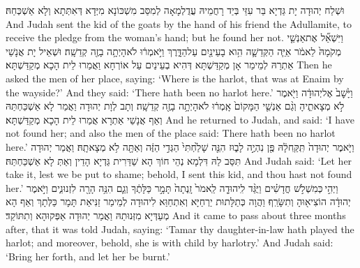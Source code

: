 {וּשְׁלַח יְהוּדָה יָת גַּדְיָא בַּר עִזֵּי בְּיַד רָחֲמֵיהּ עֲדֻלְמָאָה לְמִסַּב מִשְׁכּוֹנָא מִיְּדָא דְּאִתְּתָא וְלָא אַשְׁכְּחַהּ׃}
{And Judah sent the kid of the goats by the hand of his friend the Adullamite, to receive the pledge from the woman’s hand; but he found her not.}{}
{וַיִּשְׁאַ֞ל אֶת\maqqaf אַנְשֵׁ֤י מְקֹמָהּ֙ לֵאמֹ֔ר אַיֵּ֧ה הַקְּדֵשָׁ֛ה הִ֥וא בָעֵינַ֖יִם עַל\maqqaf הַדָּ֑רֶךְ וַיֹּ֣אמְר֔וּ לֹא\maqqaf הָיְתָ֥ה בָזֶ֖ה קְדֵשָֽׁה׃}
{וּשְׁאֵיל יָת אֲנָשֵׁי אַתְרַהּ לְמֵימַר אָן מְקַדַּשְׁתָּא דְּהִיא בְעֵינַיִם עַל אוֹרְחָא וַאֲמַרוּ לֵית הָכָא מְקַדַּשְׁתָּא׃}
{Then he asked the men of her place, saying: ‘Where is the harlot, that was at Enaim by the wayside?’ And they said: ‘There hath been no harlot here.’}{}
{וַיָּ֙שׇׁב֙ אֶל\maqqaf יְהוּדָ֔ה וַיֹּ֖אמֶר לֹ֣א מְצָאתִ֑יהָ וְגַ֨ם אַנְשֵׁ֤י הַמָּקוֹם֙ אָֽמְר֔וּ לֹא\maqqaf הָיְתָ֥ה בָזֶ֖ה קְדֵשָֽׁה׃}
{וְתָב לְוָת יְהוּדָה וַאֲמַר לָא אַשְׁכַּחְתַּהּ וְאַף אֲנָשֵׁי אַתְרָא אֲמַרוּ לֵית הָכָא מְקַדַּשְׁתָּא׃}
{And he returned to Judah, and said: ‘I have not found her; and also the men of the place said: There hath been no harlot here.’}{}
{וַיֹּ֤אמֶר יְהוּדָה֙ תִּֽקַּֽח\maqqaf לָ֔הּ פֶּ֖ן נִהְיֶ֣ה לָב֑וּז הִנֵּ֤ה שָׁלַ֙חְתִּי֙ הַגְּדִ֣י הַזֶּ֔ה וְאַתָּ֖ה לֹ֥א מְצָאתָֽהּ׃}
{וַאֲמַר יְהוּדָה תִּסַּב לַהּ דִּלְמָא נְהֵי חוֹךְ הָא שַׁדַּרִית גַּדְיָא הָדֵין וְאַתְּ לָא אַשְׁכַּחְתַּהּ׃}
{And Judah said: ‘Let her take it, lest we be put to shame; behold, I sent this kid, and thou hast not found her.’}{}
{וַיְהִ֣י \legarmeh  כְּמִשְׁלֹ֣שׁ חֳדָשִׁ֗ים וַיֻּגַּ֨ד לִֽיהוּדָ֤ה לֵֽאמֹר֙ זָֽנְתָה֙ תָּמָ֣ר כַּלָּתֶ֔ךָ וְגַ֛ם הִנֵּ֥ה הָרָ֖ה לִזְנוּנִ֑ים וַיֹּ֣אמֶר יְהוּדָ֔ה הוֹצִיא֖וּהָ וְתִשָּׂרֵֽף׃}
{וַהֲוָה כְּתַלָּתוּת יַרְחַיָּא וְאִתְחַוַּא לִיהוּדָה לְמֵימַר זַנִּיאַת תָּמָר כַּלְּתָךְ וְאַף הָא מְעַדְּיָא מִזְּנוּתַהּ וַאֲמַר יְהוּדָה אַפְּקוּהָא וְתִתּוֹקַד׃}
{And it came to pass about three months after, that it was told Judah, saying: ‘Tamar thy daughter-in-law hath played the harlot; and moreover, behold, she is with child by harlotry.’ And Judah said: ‘Bring her forth, and let her be burnt.’}{}
